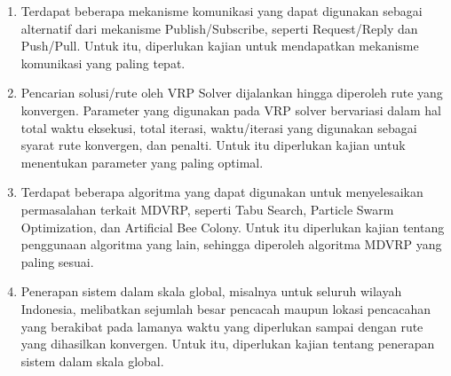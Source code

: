 \begin{enumerate}
	\item Terdapat beberapa mekanisme komunikasi yang dapat digunakan sebagai alternatif dari mekanisme Publish/Subscribe, seperti Request/Reply dan Push/Pull. Untuk itu, diperlukan kajian untuk mendapatkan mekanisme komunikasi yang paling tepat.
	\item Pencarian solusi/rute oleh VRP Solver dijalankan hingga diperoleh rute yang konvergen. Parameter yang digunakan pada VRP solver bervariasi dalam hal total waktu eksekusi, total iterasi, waktu/iterasi yang digunakan sebagai syarat rute konvergen, dan penalti. Untuk itu diperlukan kajian untuk menentukan parameter yang paling optimal.
	\item Terdapat beberapa algoritma yang dapat digunakan untuk menyelesaikan permasalahan terkait MDVRP, seperti Tabu Search, Particle Swarm Optimization, dan Artificial Bee Colony. Untuk itu diperlukan kajian tentang penggunaan algoritma yang lain, sehingga diperoleh algoritma MDVRP yang paling sesuai.
	\item Penerapan sistem dalam skala global, misalnya untuk seluruh wilayah Indonesia, melibatkan sejumlah besar pencacah maupun lokasi pencacahan yang berakibat pada lamanya waktu yang diperlukan sampai dengan rute yang dihasilkan konvergen. Untuk itu, diperlukan kajian tentang penerapan sistem dalam skala global.
\end{enumerate}
